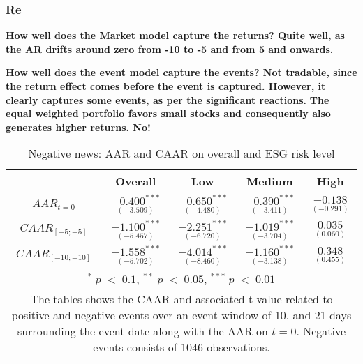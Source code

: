 \subsubsection{Re}





\textbf{How well does the Market model capture the returns? Quite well, as the AR drifts around zero from -10 to -5 and from 5 and onwards. }

\textbf{How well does the event model capture the events? Not tradable, since the return effect comes before the event is captured. However, it clearly captures some events, as per the significant reactions. }
\textbf{The equal weighted portfolio favors small stocks and consequently also generates higher returns. No! }


\begin{table}[H]
\centering
\caption{Negative news: AAR and CAAR on overall and ESG risk level} 
\begin{tabular}{ccccc}
  \hline  \hline
  & \multicolumn{1}{c}{Overall} &  \multicolumn{1}{c}{Low} & \multicolumn{1}{c}{Medium} & \multicolumn{1}{c}{High}\\  
 \hline
$AAR_{t=0}$ &   $\underset{(-3.509)}{-0.400^{***}}$ &   $\underset{(-4.480)}{-0.650^{***}}$ &   $\underset{(-3.411)}{-0.390^{***}}$ &   $\underset{(-0.291)}{-0.138 }$ \\

$CAAR_{[-5;+5]}$  &  $\underset{(-5.457)}{-1.100^{***}}$ &   $\underset{(-6.720)}{-2.251^{***}}$ &   $\underset{(-3.704)}{-1.019^{***}}$ &   $\underset{(0.060)}{0.035}$ \\ 

$CAAR_{[-10;+10]}$    & $\underset{(-5.702)}{-1.558^{***}}$ &   $\underset{(-8.460)}{-4.014^{***}}$ &   $\underset{(-3.138)}{-1.160^{***}}$ &   $\underset{(0.455)}{0.348}$ \\ 
   \hline \hline
   \multicolumn{5}{p{12cm}}{ \footnotesize $^* \; p\; <\; 0.1$, $ ^{**} \; p\; <\; 0.05$, $ ^{***} \; p\; <\; 0.01$  } \\
   \multicolumn{5}{p{13cm}}{\footnotesize The tables shows the CAAR and associated t-value related to positive and negative events over an event window of 10, and 21 days surrounding the event date along with the AAR on $t=0$. Negative events consists of 1046 observations. } \\
   \hline
\end{tabular}
\label{tab: ST_neg_significance}
\end{table}


